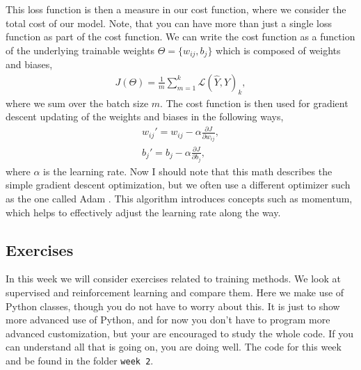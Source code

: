 \documentclass[12pt,a4paper]{article} %
\numberwithin{equation}{section}
\newcommand{\pd}{\partial}
\begin{document}
		This loss function is then a measure in our cost function, where we consider the total cost of our model. Note, that you can have more than just a single loss function as part of the cost function. We can write the cost function as a function of the underlying trainable weights $\Theta = \{w_{ij}, b_j\}$ which is composed of weights and biases,
		\begin{gather}
			J(\Theta) = \frac{1}{m} \sum_{m=1}^{k} \mathcal{L}(\hat{Y}, Y)_k,
		\end{gather}
		where we sum over the batch size $m$. The cost function is then used for gradient descent updating of the weights and biases in the following ways,
		\begin{gather}
			w_{ij}' = w_{ij} - \alpha \frac{\pd J}{\pd w_{ij}},\\
			b_{j}' = b_j - \alpha \frac{\pd J}{\pd b_{j}},
		\end{gather}
		where $\alpha$ is the learning rate. Now I should note that this math describes the simple gradient descent optimization, but we often use a different optimizer such as the one called Adam \cite{kingma:2017}. This algorithm introduces concepts such as momentum, which helps to effectively adjust the learning rate along the way.

	\subsection{Exercises}
		In this week we will consider exercises related to training methods. We look at supervised and reinforcement learning and compare them. Here we make use of Python classes, though you do not have to worry about this. It is just to show more advanced use of Python, and for now you don't have to program more advanced customization, but your are encouraged to study the whole code. If you can understand all that is going on, you are doing well. The code for this week and be found in the folder \texttt{week 2}.\newline
		
\end{document}
